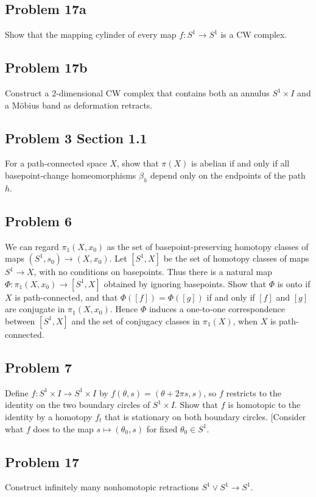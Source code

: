\subsection{Problem 17a}
\begin{prob}
    Show that the mapping cylinder of every map $ f \colon S^{1} \to S^{1}$ is a CW complex.
\end{prob}

\subsection{Problem 17b}
\begin{prob}
    Construct a $2$-dimensional CW complex that contains both an annulus $S^{1}\times I$ and a M\"obius band as deformation retracts.
\end{prob}

\subsection{Problem 3 Section 1.1}
\begin{prob}
    For a path-connected space $X$, show that $\pi\left( X \right) $ is abelian if and only if all basepoint-change homeomorphisms $\beta_h$ depend only on the endpoints of the path $h$.
\end{prob}

\subsection{Problem 6}
\begin{prob}
    We can regard $\pi_1\left( X,x_0 \right) $ as the set of basepoint-preserving homotopy classes of maps $\left( S^{1},s_0 \right) \to \left( X,x_0 \right) $. Let $\left[ S^{1},X \right] $ be the set of homotopy classes of maps $S^{1}\to X$, with no conditions on basepoints. Thus there is a natural map $\Phi : \pi_1\left( X,x_0 \right) \to \left[ S^{1},X \right] $ obtained by ignoring basepoints. Show that $\Phi$ is onto if $X$ is path-connected, and that $\Phi([f]) = \Phi([g])$ if and only if $[f]$ and $[g]$ are conjugate in $\pi_1\left( X,x_0 \right) $. Hence $\Phi$ induces a one-to-one correspondence between $\left[ S^{1},X \right] $ and the set of conjugacy classes in $\pi_1\left( X \right) $, when $X$ is path-connected. 
\end{prob}

\subsection{Problem 7}
\begin{prob}
    Define $ f \colon S^{1}\times I\to S^{1}\times I$ by $f(\theta, s)=(\theta + 2\pi s,s)$, so $f$ restricts to the identity on the two boundary circles of $S^{1}\times I$. Show that $f$ is homotopic to the identity by a homotopy $f_t$ that is stationary on both boundary circles. [Consider what $f$ does to the map $s \mapsto (\theta_0,s)$ for fixed $\theta_0\in S^{1}$. 
\end{prob}

\subsection{Problem 17}
\begin{prob}
    Construct infinitely many nonhomotopic retractions $S^{1} \vee S^{1} \to S^{1} $.
\end{prob}




